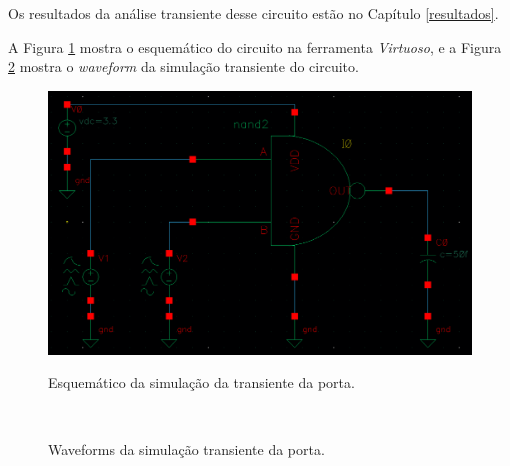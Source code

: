 \documentclass{iiufrgs}
\newcommand{\virtuoso}{\textit{Virtuoso}}
\begin{document}
\FloatBarrier

Os resultados da análise transiente desse circuito estão no Capítulo \ref{resultados}.\

A Figura \ref{fig:trans-nor} mostra o esquemático do circuito na ferramenta \virtuoso, e a Figura \ref{fig:wave-nor} mostra o \textit{waveform} da simulação transiente do circuito.\

\begin{figure}[htbp]
    \centering
    \caption{Esquemático da simulação da transiente da porta.}
    \includegraphics[scale=0.45]{images/schem_trans_nand.png}
    \label{fig:trans-nor}
\end{figure}

\begin{figure}[htbp]
    \centering
    \caption{Waveforms da simulação transiente da porta.}
     \\
    \label{fig:wave-nor}
\end{figure}
\end{document}
